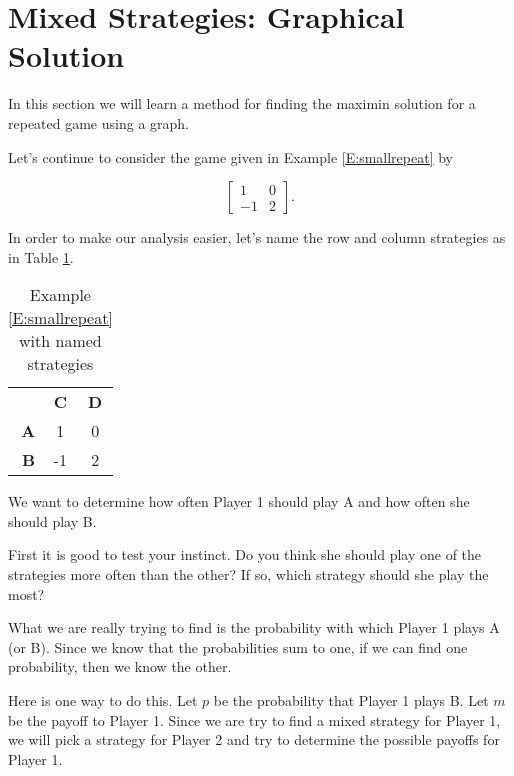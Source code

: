 
\section{Mixed Strategies: Graphical Solution}

In this section we will learn a method for finding the maximin solution for a repeated game using a graph.

Let's continue to consider the game given in Example \ref{E:smallrepeat} by 

\[\left[\begin{matrix}
1&0\\
-1&2

\end{matrix}\right].\]

In order to make our analysis easier, let's name the row and column strategies as in Table \ref{T:smallrepeat}.

\begin{table}[h]
\centering
\begin{tabular}{rcc}
&\textbf{C}&\textbf{D}\\ 
\textbf{A} &1&0 \\ 
\textbf{B}&-1&2 \\ 
\end{tabular}
\caption{Example \ref{E:smallrepeat} with named strategies}
\label{T:smallrepeat}
\end{table}

We want to determine how often Player 1 should play A and how often she should play B.
\begin{xca}\label{E:linearconjecture}
First it is good to test your instinct. Do you think she should play one of the strategies more often than the other? If so, which strategy should she play the most?
\end{xca}

What we are really trying to find is the probability with which Player 1 plays A (or B). Since we know that the probabilities sum to one, if we can find one probability, then we know the other. 

Here is one way to do this. Let $p$ be the probability that Player 1 plays B. Let $m$ be the payoff to Player 1. Since we are try to find a mixed strategy for Player 1, we will pick a strategy for Player 2 and try to determine the possible payoffs for Player 1.

